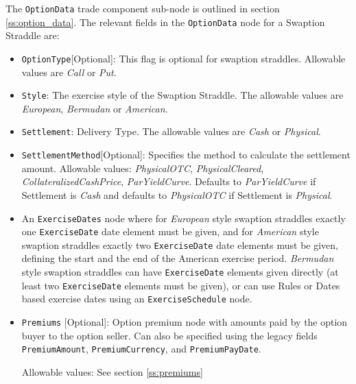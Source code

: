 The \lstinline!OptionData! trade component sub-node is outlined in section \ref{ss:option_data}. 
The relevant fields in the \lstinline!OptionData! node for a Swaption Straddle are:

\begin{itemize}

\item \lstinline!OptionType![Optional]: This flag is optional for swaption straddles. Allowable values are \emph{Call} or \emph{Put}.

\item  \lstinline!Style!: The exercise style of the Swaption Straddle. The allowable values are \emph{European}, \emph{Bermudan} or \emph{American}.

\item  \lstinline!Settlement!: Delivery Type. The allowable values are \emph{Cash} or \emph{Physical}.

\item \lstinline!SettlementMethod![Optional]: Specifies the method to calculate the settlement amount. Allowable values: \emph{PhysicalOTC}, \emph{PhysicalCleared}, \emph{CollateralizedCashPrice}, \emph{ParYieldCurve}. Defaults to \emph{ParYieldCurve} if Settlement is \emph{Cash} and defaults to \emph{PhysicalOTC} if Settlement is \emph{Physical}.

\item An \lstinline!ExerciseDates! node where for \emph{European} style swaption straddles exactly one \lstinline!ExerciseDate! date element must be given, and for \emph{American} style swaption straddles exactly two \lstinline!ExerciseDate! date elements must be given, defining the start and the end of the American exercise period. \emph{Bermudan} style swaption straddles can have \lstinline!ExerciseDate! elements given directly (at least two \lstinline!ExerciseDate! elements must be given), or can use Rules or Dates based exercise dates using an \lstinline!ExerciseSchedule! node.

\item \lstinline!Premiums! [Optional]: Option premium node with amounts paid by the option buyer to the option seller. Can also be specified using the legacy fields \lstinline!PremiumAmount!, \lstinline!PremiumCurrency!, and \lstinline!PremiumPayDate!.

Allowable values: See section \ref{ss:premiums}

\end{itemize}



